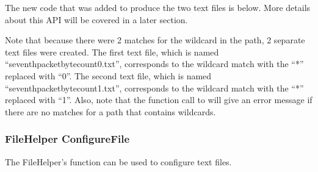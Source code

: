 \documentclass[letterpaper,10pt,english]{sphinxmanual}
\renewcommand{\sphinxcode}[1]{\texttt{\small{#1}}}
\begin{document}
The new code that was added to produce the two text files is below.
More details about this API will be covered in a later section.

Note that because there were 2 matches for the wildcard in the path,
2 separate text files were created.  The first text file, which is
named “seventh\sphinxhyphen{}packet\sphinxhyphen{}byte\sphinxhyphen{}count\sphinxhyphen{}0.txt”, corresponds to the
wildcard match with the “*” replaced with “0”.  The second text file,
which is named “seventh\sphinxhyphen{}packet\sphinxhyphen{}byte\sphinxhyphen{}count\sphinxhyphen{}1.txt”, corresponds to
the wildcard match with the “*” replaced with “1”.  Also, note that
the function call to \sphinxcode{} will give an error message if
there are no matches for a path that contains wildcards.

\begin{sphinxVerbatim}[commandchars=\\\{\}]
 

 

 

 
\end{sphinxVerbatim}


\subsubsection{FileHelper ConfigureFile}
\label{\detokenize{data-collection-helpers:filehelper-configurefile}}
The FileHelper’s \sphinxcode{} function can be used
to configure text files.
\end{document}
